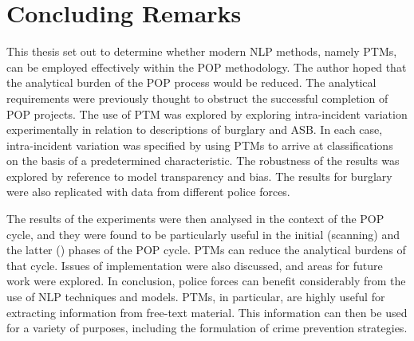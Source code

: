 \section{Concluding Remarks} This thesis set out to determine whether modern NLP methods, namely PTMs, can be employed effectively within the POP methodology. The author hoped that the analytical burden of the POP process would be reduced. The analytical requirements were previously thought to obstruct the successful completion of POP projects. The use of PTM was explored by exploring intra-incident variation experimentally in relation to descriptions of burglary and ASB. In each case, intra-incident variation was specified by using PTMs to arrive at classifications on the basis of a predetermined characteristic. The robustness of the results was explored by reference to model transparency and bias. The results for burglary were also replicated with data from different police forces.

The results of the experiments were then analysed in the context of the POP cycle, and they were found to be particularly useful in the initial (scanning) and the latter () phases of the POP cycle. PTMs can reduce the analytical burdens of that cycle. Issues of implementation were also discussed, and areas for future work were explored. In conclusion, police forces can benefit considerably from the use of NLP techniques and models. PTMs, in particular, are highly useful for extracting information from free-text material. This information can then be used for a variety of purposes, including the formulation of crime prevention strategies.






